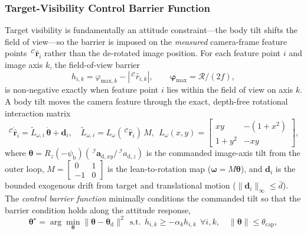 \documentclass{IEEEtaes}
\begin{document}
\subsubsection{Target-Visibility Control Barrier Function} \label{acceleration conditioning: section}
Target visibility is fundamentally an attitude constraint---the body tilt shifts the field of view---so the barrier is imposed on the \emph{measured} camera-frame feature points $\,^\mathcal{C}\hat{\boldsymbol{r}}_i$ rather than the de-rotated image position. For each feature point $i$ and image axis $k$, the field-of-view barrier
\begin{equation} \label{cbf barrier: equation}
    h_{i,k} = \varphi_{\text{max},k} - |\,^\mathcal{C}\hat{r}_{i,k}|,\qquad \boldsymbol{\varphi}_\text{max}=\mathcal{R}/(2f),
\end{equation}
is non-negative exactly when feature point $i$ lies within the field of view on axis $k$. A body tilt moves the camera feature through the exact, depth-free rotational interaction matrix
\begin{equation} \label{Lw: equation}
    \,^\mathcal{C}\dot{\hat{\boldsymbol{r}}}_i = \tilde{L}_{\omega,i}\,\dot{\boldsymbol{\theta}} + \boldsymbol{d}_i,\quad \tilde{L}_{\omega,i}=L_\omega(\,^\mathcal{C}\hat{\boldsymbol{r}}_i)\,M,\ \ L_\omega(x,y)=\begin{bmatrix} xy & -(1+x^2)\\ 1+y^2 & -xy\end{bmatrix},
\end{equation}
where $\boldsymbol{\theta}=R_z(-\psi_\text{b})(\,^\mathcal{I}\boldsymbol{a}_{\text{d},xy}/\,^\mathcal{I}a_{\text{d},z})$ is the commanded image-axis tilt from the outer loop, $M=[\begin{smallmatrix}0&1\\-1&0\end{smallmatrix}]$ is the lean-to-rotation map ($\boldsymbol{\omega}=M\boldsymbol{\theta}$), and $\boldsymbol{d}_i$ is the bounded exogenous drift from target and translational motion ($\|\boldsymbol{d}_i\|_\infty\le\bar{d}$). The \emph{control barrier function} minimally conditions the commanded tilt so that the barrier condition holds along the attitude response,
\begin{equation} \label{cbf qp: equation}
    \boldsymbol{\theta}^\star=\arg\min_{\boldsymbol{\theta}}\|\boldsymbol{\theta}-\boldsymbol{\theta}_\text{d}\|^2\ \ \text{s.t.}\ \ \dot{h}_{i,k}\ge-\alpha_k h_{i,k}\ \ \forall i,k,\quad \|\boldsymbol{\theta}\|\le\theta_\text{cap},
\end{equation}
\end{document}
